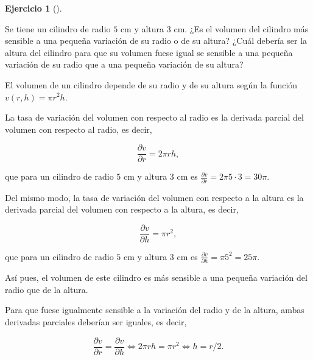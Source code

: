 \documentclass[
  spanish,
  a4paper,
]{scrreport}
\theoremstyle{definition}
\newtheorem{exercise}{Ejercicio}[chapter]
\theoremstyle{remark}
\begin{document}
\begin{exercise}[]\protect\hypertarget{exr-variacion-volumen-cilindro}{}\label{exr-variacion-volumen-cilindro}

Se tiene un cilindro de radio \(5\) cm y altura \(3\) cm. ¿Es el volumen
del cilindro más sensible a una pequeña variación de su radio o de su
altura? ¿Cuál debería ser la altura del cilindro para que su volumen
fuese igual se sensible a una pequeña variación de su radio que a una
pequeña variación de su altura?

\end{exercise}

\begin{tcolorbox}[enhanced jigsaw, arc=.35mm, bottomrule=.15mm, bottomtitle=1mm, breakable, colback=white, colbacktitle=quarto-callout-tip-color!10!white, colframe=quarto-callout-tip-color-frame, coltitle=black, left=2mm, leftrule=.75mm, opacityback=0, opacitybacktitle=0.6, rightrule=.15mm, title=\textcolor{quarto-callout-tip-color}{\faLightbulb}\hspace{0.5em}{Solución}, titlerule=0mm, toprule=.15mm, toptitle=1mm]

El volumen de un cilindro depende de su radio y de su altura según la
función \(v(r,h)=\pi r^2h\).

La tasa de variación del volumen con respecto al radio es la derivada
parcial del volumen con respecto al radio, es decir,

\[
\frac{\partial v}{\partial r} = 2\pi rh,
\]

que para un cilindro de radio \(5\) cm y altura \(3\) cm es
\(\frac{\partial v}{\partial r} = 2\pi 5\cdot 3  = 30\pi\).

Del mismo modo, la tasa de variación del volumen con respecto a la
altura es la derivada parcial del volumen con respecto a la altura, es
decir,

\[
\frac{\partial v}{\partial h} = \pi r^2,
\]

que para un cilindro de radio \(5\) cm y altura \(3\) cm es
\(\frac{\partial v}{\partial h} = \pi 5^2  = 25\pi\).

Así pues, el volumen de este cilindro es más sensible a una pequeña
variación del radio que de la altura.

Para que fuese igualmente sensible a la variación del radio y de la
altura, ambas derivadas parciales deberían ser iguales, es decir,

\[
\frac{\partial v}{\partial r} = \frac{\partial v}{\partial h}  \Leftrightarrow 2\pi r h = \pi r^2 \Leftrightarrow h = r/2.
\]

\end{tcolorbox}
\end{document}
